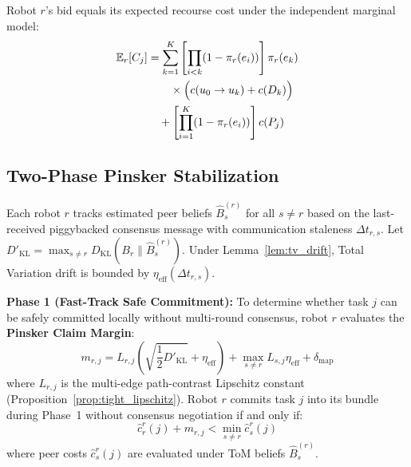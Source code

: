 \documentclass[lettersize,journal]{IEEEtran}
\begin{document}
Robot $r$'s bid equals its expected recourse cost under the independent marginal model:
\begin{align}
    \mathbb{E}_r[C_j] &= \sum_{k=1}^K \left[ \prod_{i < k} (1 - \pi_r(e_i)) \right] \pi_r(e_k) \notag \\
    &\quad\quad \times \Big( c(u_0 \to u_k) + c(D_k) \Big) \notag \\
    &\quad + \left[ \prod_{i=1}^K (1 - \pi_r(e_i)) \right] c(P_j)
\label{eq:expected_recourse_cost}
\end{align}

\subsection{Two-Phase Pinsker Stabilization}
Each robot $r$ tracks estimated peer beliefs $\hat{B}_s^{(r)}$ for all $s \ne r$ based on the last-received piggybacked consensus message with communication staleness $\Delta t_{r,s}$. Let $D'_{\text{KL}} = \max_{s \ne r} D_{\text{KL}}(B_r \parallel \hat{B}_s^{(r)})$. Under Lemma~\ref{lem:tv_drift}, Total Variation drift is bounded by $\eta_{\text{eff}}(\Delta t_{r,s})$.

\noindent\textbf{Phase 1 (Fast-Track Safe Commitment):} To determine whether task $j$ can be safely committed locally without multi-round consensus, robot $r$ evaluates the \textbf{Pinsker Claim Margin}:
\begin{equation}
    m_{r, j} = L_{r, j} \left( \sqrt{\frac{1}{2} D'_{\text{KL}}} + \eta_{\text{eff}} \right) + \max_{s \ne r} L_{s, j} \eta_{\text{eff}} + \delta_{\text{map}}
\label{eq:pinsker_margin}
\end{equation}
where $L_{r, j}$ is the multi-edge path-contrast Lipschitz constant (Proposition~\ref{prop:tight_lipschitz}). Robot $r$ commits task $j$ into its bundle during Phase~1 without consensus negotiation if and only if:
\begin{equation}
    \hat{c}_r^r(j) + m_{r, j} < \min_{s \ne r} \hat{c}_s^r(j)
\label{eq:claim_rule}
\end{equation}
where peer costs $\hat{c}_s^r(j)$ are evaluated under ToM beliefs $\hat{B}_s^{(r)}$.
\end{document}
